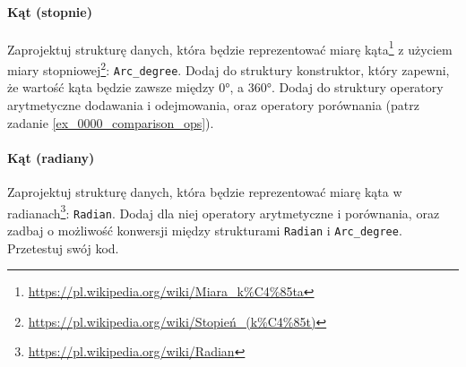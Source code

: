 \documentclass[11pt,a4paper,titlepage,onecolumn]{article}
\begin{document}
\paragraph{Kąt (stopnie)} Zaprojektuj strukturę danych, która będzie reprezentować miarę
kąta\footnote{\url{https://pl.wikipedia.org/wiki/Miara_k\%C4\%85ta}} z użyciem miary
stopniowej\footnote{\url{https://pl.wikipedia.org/wiki/Stopień_(k\%C4\%85t)}}:
\texttt{Arc\_degree}.
Dodaj do struktury konstruktor, który zapewni, że wartość kąta będzie zawsze
między 0°, a 360°. Dodaj do struktury operatory arytmetyczne dodawania i
odejmowania, oraz operatory porównania (patrz zadanie
\ref{ex_0000_comparison_ops}).

\paragraph{Kąt (radiany)} Zaprojektuj strukturę danych, która będzie reprezentować
miarę kąta w radianach\footnote{\url{https://pl.wikipedia.org/wiki/Radian}}:
\texttt{Radian}. Dodaj dla niej operatory arytmetyczne i porównania, oraz zadbaj
o możliwość konwersji między strukturami \texttt{Radian} i \texttt{Arc\_degree}.
Przetestuj swój kod.



% 

% 

% 


% 

% 

% 


% 

% 

\end{document}
